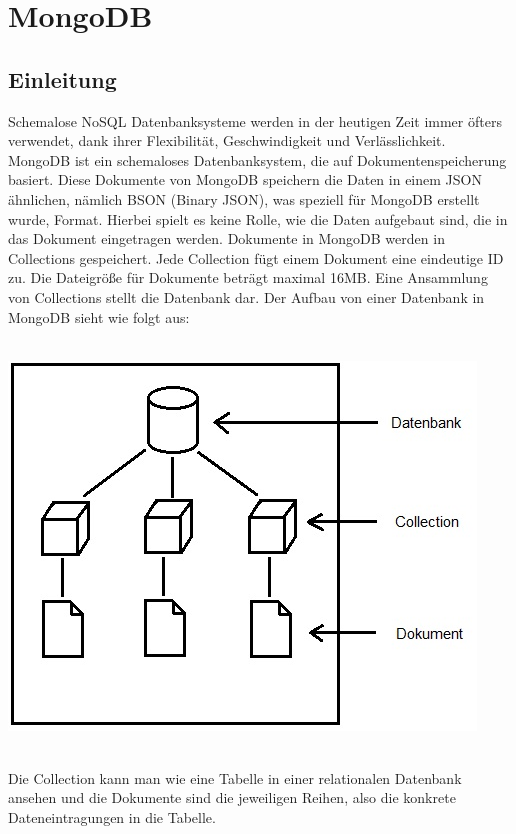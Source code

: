 \section{MongoDB}
\subsection{Einleitung}
Schemalose NoSQL Datenbanksysteme werden in der heutigen Zeit immer öfters verwendet, dank ihrer Flexibilität, Geschwindigkeit und Verlässlichkeit. MongoDB ist ein schemaloses Datenbanksystem, die auf Dokumentenspeicherung basiert. Diese Dokumente von MongoDB speichern die Daten in einem JSON ähnlichen, nämlich BSON (Binary JSON), was speziell für MongoDB erstellt wurde, Format. Hierbei spielt es keine Rolle, wie die Daten aufgebaut sind, die in das Dokument eingetragen werden. Dokumente in MongoDB werden in Collections gespeichert. Jede Collection fügt einem Dokument eine eindeutige ID zu.  Die Dateigröße für Dokumente beträgt maximal 16MB. Eine Ansammlung von Collections stellt die Datenbank dar.
Der Aufbau von einer Datenbank in MongoDB sieht wie folgt aus:
\\
\\
\begin{minipage}{\textwidth}
    \centering
    \includegraphics[scale=0.9]{images/Datenmodell_Mongo.jpg}
    \label{fig:ver}
\end{minipage}
\\
Die Collection kann man wie eine Tabelle in einer relationalen Datenbank ansehen und die Dokumente sind die jeweiligen Reihen, also die konkrete Dateneintragungen in die Tabelle.
